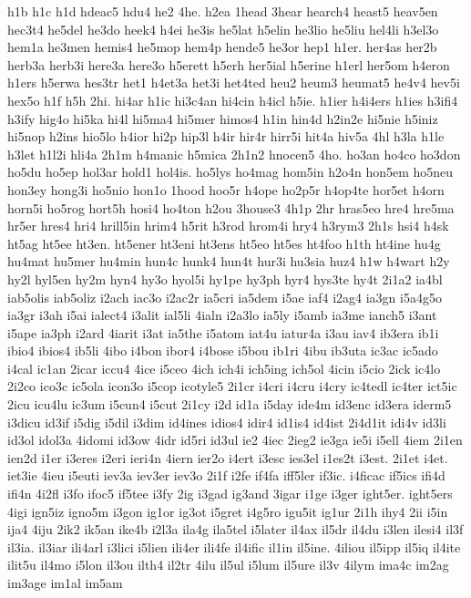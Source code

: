 {h1b
h1c
h1d
hdeac5
hdu4
he2
4he.
h2ea
1head
3hear
hearch4
heast5
heav5en
hec3t4
he5del
he3do
heek4
h4ei
he3is
he5lat
h5elin
he3lio
he5liu
hel4li
h3el3o
hem1a
he3men
hemis4
he5mop
hem4p
hende5
he3or
hep1
h1er.
her4as
her2b
herb3a
herb3i
here3a
here3o
h5erett
h5erh
her5ial
h5erine
h1erl
her5om
h4eron
h1ers
h5erwa
hes3tr
het1
h4et3a
het3i
het4ted
heu2
heum3
heumat5
he4v4
hev5i
hex5o
h1f
h5h
2hi.
hi4ar
h1ic
hi3c4an
hi4cin
h4icl
h5ie.
h1ier
h4i4ers
h1ies
h3ifi4
h3ify
hig4o
hi5ka
hi4l
hi5ma4
hi5mer
himos4
h1in
hin4d
h2in2e
hi5nie
h5iniz
hi5nop
h2ins
hio5lo
h4ior
hi2p
hip3l
h4ir
hir4r
hirr5i
hit4a
hiv5a
4hl
h3la
h1le
h3let
h1l2i
hli4a
2h1m
h4manic
h5mica
2h1n2
hnocen5
4ho.
ho3an
ho4co
ho3don
ho5du
ho5ep
hol3ar
hold1
hol4is.
ho5lys
ho4mag
hom5in
h2o4n
hon5em
ho5neu
hon3ey
hong3i
ho5nio
hon1o
1hood
hoo5r
h4ope
ho2p5r
h4op4te
hor5et
h4orn
horn5i
ho5rog
hort5h
hosi4
ho4ton
h2ou
3house3
4h1p
2hr
hras5eo
hre4
hre5ma
hr5er
hres4
hri4
hrill5in
hrim4
h5rit
h3rod
hrom4i
hry4
h3rym3
2h1s
hsi4
h4sk
ht5ag
ht5ee
ht3en.
ht5ener
ht3eni
ht3ens
ht5eo
ht5es
ht4foo
h1th
ht4ine
hu4g
hu4mat
hu5mer
hu4min
hun4c
hunk4
hun4t
hur3i
hu3sia
huz4
h1w
h4wart
h2y
hy2l
hyl5en
hy2m
hyn4
hy3o
hyol5i
hy1pe
hy3ph
hyr4
hys3te
hy4t
2i1a2
ia4bl
iab5olis
iab5oliz
i2ach
iac3o
i2ac2r
ia5cri
ia5dem
i5ae
iaf4
i2ag4
ia3gn
i5a4g5o
ia3gr
i3ah
i5ai
ialect4
i3alit
ial5li
4ialn
i2a3lo
ia5ly
i5amb
ia3me
ianch5
i3ant
i5ape
ia3ph
i2ard
4iarit
i3at
ia5the
i5atom
iat4u
iatur4a
i3au
iav4
ib3era
ib1i
ibio4
ibios4
ib5li
4ibo
i4bon
ibor4
i4bose
i5bou
ib1ri
4ibu
ib3uta
ic3ac
ic5ado
i4cal
ic1an
2icar
iccu4
4ice
i5ceo
4ich
ich4i
ich5ing
ich5ol
4icin
i5cio
2ick
ic4lo
2i2co
ico3c
ic5ola
icon3o
i5cop
icotyle5
2i1cr
i4cri
i4cru
i4cry
ic4tedl
ic4ter
ict5ic
2icu
icu4lu
ic3um
i5cun4
i5cut
2i1cy
i2d
id1a
i5day
ide4m
id3enc
id3era
iderm5
i3dicu
id3if
i5dig
i5dil
i3dim
id4ines
idios4
idir4
id1is4
id4ist
2i4d1it
idi4v
id3li
id3ol
idol3a
4idomi
id3ow
4idr
id5ri
id3ul
ie2
4iec
2ieg2
ie3ga
ie5i
i5ell
4iem
2i1en
ien2d
i1er
i3eres
i2eri
ieri4n
4iern
ier2o
i4ert
i3esc
ies3el
i1es2t
i3est.
2i1et
i4et.
iet3ie
4ieu
i5euti
iev3a
iev3er
iev3o
2i1f
i2fe
if4fa
iff5ler
if3ic.
i4ficac
if5ics
ifi4d
ifi4n
4i2fl
i3fo
ifoc5
if5tee
i3fy
2ig
i3gad
ig3and
3igar
i1ge
i3ger
ight5er.
ight5ers
4igi
ign5iz
igno5m
i3gon
ig1or
ig3ot
i5gret
i4g5ro
igu5it
ig1ur
2i1h
ihy4
2ii
i5in
ija4
4iju
2ik2
ik5an
ike4b
i2l3a
ila4g
ila5tel
i5later
il4ax
il5dr
il4du
i3len
ilesi4
il3f
il3ia.
il3iar
ili4arl
i3lici
i5lien
ili4er
ili4fe
il4ific
il1in
il5ine.
4iliou
il5ipp
il5iq
il4ite
ilit5u
il4mo
i5lon
il3ou
ilth4
il2tr
4ilu
il5ul
i5lum
il5ure
il3v
4ilym
ima4c
im2ag
im3age
im1al
im5am
}
